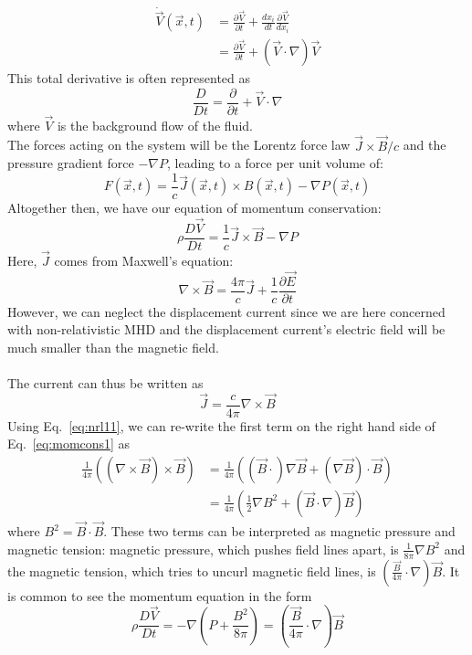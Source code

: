   \begin{align}
    \dot \vec V(\vec x,t)&=\frac{\partial \vec V}{\partial t}+\frac{dx_i}{dt}\frac{\partial \vec V}{dx_i}\\
    &=\frac{\partial\vec V}{\partial t}+\left(\vec V\cdot\nabla\right)\vec V
  \end{align}
  This total derivative is often represented as
  \begin{equation}
    \frac{D}{Dt}=\frac\partial{\partial t}+\vec V\cdot\nabla
  \end{equation}
  where $\vec V$ is the background flow of the fluid.
\\
  The forces acting on the system will be the Lorentz force law $\vec J\times\vec B/c$ and the pressure gradient force $-\nabla P$, leading to a force per unit volume of:
\begin{equation}
  F(\vec x,t)=\frac1c\vec J(\vec x,t)\times B(\vec x,t)-\nabla P(\vec x,t)
\end{equation}
Altogether then, we have our equation of momentum conservation:
\begin{equation}
  \rho\frac{D\vec V}{Dt}=\frac1c\vec J\times\vec B-\nabla P \label{eq:momcons1}
\end{equation}
Here, $\vec J$ comes from Maxwell's equation:
\begin{equation}
  \nabla\times\vec B=\frac{4\pi}c\vec J+\frac1c\frac{\partial\vec E}{\partial t}
\end{equation}
However, we can neglect the displacement current since we are here concerned with non-relativistic MHD and the displacement current's electric field will be much smaller than the magnetic field.\\
\\
The current can thus be written as
\begin{equation}
  \vec J=\frac{c}{4\pi}\nabla\times\vec B \label{eq:current}
\end{equation}
Using Eq.~\ref{eq:nrl11}, we can re-write the first term on the right hand side of Eq.~\ref{eq:momcons1} as
\begin{align}
  \frac1{4\pi}\left((\nabla\times\vec B)\times\vec B\right)&=\frac1{4\pi}\left((\vec B\cdot)\nabla\vec B+(\nabla\vec B)\cdot\vec B\right)\\
  &=\frac1{4\pi}\left(\frac12\nabla B^2+(\vec B\cdot\nabla)\vec B\right)
\end{align}
where $B^2=\vec B\cdot\vec B$. These two terms can be interpreted as magnetic pressure and magnetic tension: magnetic pressure, which pushes field lines apart, is $\frac1{8\pi}\nabla B^2$ and the magnetic tension, which tries to uncurl magnetic field lines, is $(\frac{\vec B}{4\pi}\cdot\nabla)\vec B$. It is common to see the momentum equation in the form
\begin{equation}
  \rho\frac{D\vec V}{Dt}=-\nabla\left(P+\frac{B^2}{8\pi}\right)=\left(\frac{\vec B}{4\pi}\cdot\nabla\right)\vec B
\end{equation}

